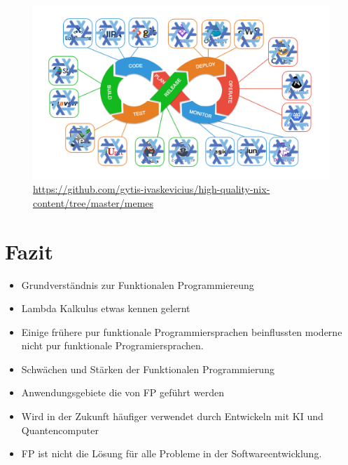 \documentclass{beamer}
\begin{document}
\begin{frame}
    \begin{figure}
    \centering
    \includegraphics[width=1\linewidth]{bilder/nixci.png}
    \textmd{\tiny \url{https://github.com/gytis-ivaskevicius/high-quality-nix-content/tree/master/memes} }
\end{figure}

\end{frame}

\section{Fazit}
\begin{frame}
	\begin{itemize}
		\item Grundverständnis zur Funktionalen Programmiereung
		\item Lambda Kalkulus etwas kennen gelernt
		\item Einige frühere pur funktionale Programmiersprachen beinflussten moderne nicht pur funktionale Programiersprachen.
		\item Schwächen und Stärken der Funktionalen Programmierung
         \item Anwendungsgebiete die von FP geführt werden
         \item Wird in der Zukunft häufiger verwendet durch Entwickeln mit KI und Quantencomputer
         \item FP ist nicht die Lösung für alle Probleme in der Softwareentwicklung.
        \end{itemize}
\end{frame}
\end{document}
